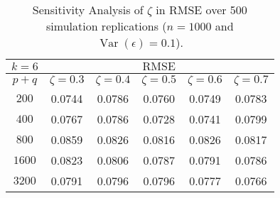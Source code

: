 \begin{table}[H]
\centering
\small 
\begin{tabular}{|c|ccccc|}
\hline
$k=6$  & \multicolumn{5}{c|}{$\text{RMSE}$}                                                                                                                 \\ \hline
$p+q$  & \multicolumn{1}{c|}{$\zeta = 0.3$} & \multicolumn{1}{c|}{$\zeta = 0.4$} & \multicolumn{1}{c|}{$\zeta = 0.5$} & \multicolumn{1}{c|}{$\zeta = 0.6$} & $\zeta = 0.7$ \\ \hline
$200$  & \multicolumn{1}{c|}{0.0744}              & \multicolumn{1}{c|}{0.0786}              & \multicolumn{1}{c|}{0.0760}              & \multicolumn{1}{c|}{0.0749}              &               0.0783\\
$400$  & \multicolumn{1}{c|}{0.0767}              & \multicolumn{1}{c|}{0.0786}              & \multicolumn{1}{c|}{0.0728}              & \multicolumn{1}{c|}{0.0741}              &               0.0799\\
$800$  & \multicolumn{1}{c|}{0.0859}              & \multicolumn{1}{c|}{0.0826}              & \multicolumn{1}{c|}{0.0816}              & \multicolumn{1}{c|}{0.0826}              &               0.0817\\
$1600$ & \multicolumn{1}{c|}{0.0823}              & \multicolumn{1}{c|}{0.0806}              & \multicolumn{1}{c|}{0.0787}              & \multicolumn{1}{c|}{0.0791}              &               0.0786\\
$3200$ & \multicolumn{1}{c|}{0.0791}              & \multicolumn{1}{c|}{0.0796}              & \multicolumn{1}{c|}{0.0796}              & \multicolumn{1}{c|}{0.0777}              &               0.0766\\ \hline
\end{tabular}
\caption{Sensitivity Analysis of $\zeta$ in RMSE over 500 simulation replications ($n = 1000$ and $\operatorname{Var}(\epsilon) = 0.1$).}
\label{tab:sen2}
\end{table}
